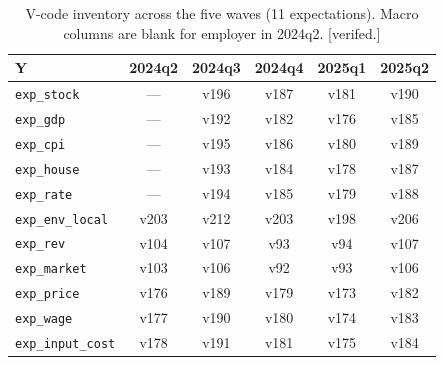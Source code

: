 \documentclass[11pt,letterpaper,english,final]{article}
\begin{document}
\begin{table}[H]
\centering
\small
\caption{V-code inventory across the five waves (11 expectations). Macro columns are blank for employer in 2024q2. {\color{cyan}[verifed.]}}


\label{tab:vcode_waves}
\begin{tabular}{lccccc}
\toprule
Y & 2024q2 & 2024q3 & 2024q4 & 2025q1 & 2025q2 \\
\midrule
\texttt{exp\_stock}    & --- & v196 & v187 & v181 & v190 \\
\texttt{exp\_gdp}      & --- & v192 & v182 & v176 & v185 \\
\texttt{exp\_cpi}      & --- & v195 & v186 & v180 & v189 \\
\texttt{exp\_house}    & --- & v193 & v184 & v178 & v187 \\
\texttt{exp\_rate}     & --- & v194 & v185 & v179 & v188 \\
\texttt{exp\_env\_local}  & v203 & v212 & v203 & v198 & v206 \\
\texttt{exp\_rev}      & v104 & v107 & v93  & v94  & v107 \\
\texttt{exp\_market}   & v103 & v106 & v92  & v93  & v106 \\
\texttt{exp\_price}    & v176 & v189 & v179 & v173 & v182 \\
\texttt{exp\_wage}     & v177 & v190 & v180 & v174 & v183 \\
\texttt{exp\_input\_cost} & v178 & v191 & v181 & v175 & v184 \\
\bottomrule
\end{tabular}
\end{table}
\end{document}
